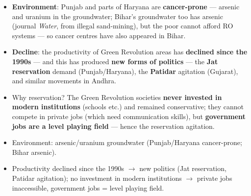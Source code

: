 \begin{KeyConcept}
\begin{itemize}
\item \textbf{Environment}: Punjab and parts of Haryana are \textbf{cancer-prone} --- arsenic and uranium in the groundwater; Bihar's groundwater too has arsenic (journal \emph{Water}, from illegal sand-mining), but the poor cannot afford RO systems --- so cancer centres have also appeared in Bihar.
\item \textbf{Decline}: the productivity of Green Revolution areas has \textbf{declined since the 1990s} --- and this has produced \textbf{new forms of politics} --- the \textbf{Jat reservation} demand (Punjab/Haryana), the \textbf{Patidar} agitation (Gujarat), and similar movements in Andhra.
\item Why reservation? The Green Revolution societies \textbf{never invested in modern institutions} (schools etc.) and remained conservative; they cannot compete in private jobs (which need communication skills), but \textbf{government jobs are a level playing field} --- hence the reservation agitation.
\end{itemize}
\end{KeyConcept}

\begin{QuickRevision}
\begin{itemize}
\item Environment: arsenic/uranium groundwater (Punjab/Haryana cancer-prone; Bihar arsenic).
\item Productivity declined since the 1990s $\rightarrow$ new politics (Jat reservation, Patidar agitation); no investment in modern institutions $\rightarrow$ private jobs inaccessible, government jobs = level playing field.
\end{itemize}
\end{QuickRevision}
